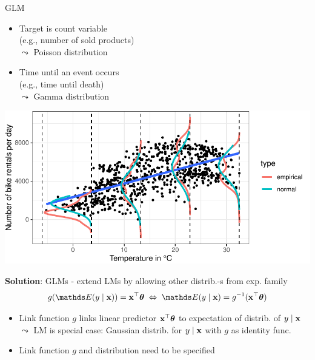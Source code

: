 \documentclass[10pt,compress,t,notes=noshow, xcolor=table]{beamer}
\begin{document}
\begin{frame}{GLM }
\begin{splitVCC}[0.5]
{\begin{itemize}
    \item Target is count variable \\(e.g., number of sold products)\\
    $\leadsto$ Poisson distribution
    \item Time until an event occurs\\ (e.g., time until death)\\
    $\leadsto$ Gamma distribution
\end{itemize}
}{
\begin{center}
    \includegraphics[width = \textwidth]{figure/density_intervals.pdf}
\end{center}
}
\end{splitVCC}
\medskip
\pause
\textbf{Solution}: GLMs - extend LMs by allowing other distrib.-s from exp. family
$$g(\E (y \mid \xv)) = \xv^\top \thetav \; \Leftrightarrow \; \E (y \mid \xv) = g^{-1}(\xv^\top \thetav)$$
\vspace*{-0.5cm}
    \begin{itemize}
        \item Link function $g$ links linear predictor $\mathbf{x}^\top \bm{\theta}$ to expectation of distrib. of $y \mid \mathbf{x}$\\ %
        $\leadsto$ LM is special case: Gaussian distrib. for $y \mid \mathbf{x}$ with $g$ as identity func. 
        \item Link function $g$ and distribution need to be specified 

\end{itemize}
\end{frame}
\end{document}
